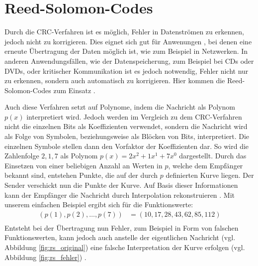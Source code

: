 \section{Reed-Solomon-Codes} \label{sec:reed_solomon_codes}
Durch die \ac{CRC}-Verfahren ist es möglich, Fehler in Datenströmen zu erkennen, jedoch nicht zu korrigieren. Dies eignet sich gut für Anwenungen , bei denen eine erneute Übertragung der Daten möglich ist, wie zum Beispiel in Netzwerken. In anderen Anwendungsfällen, wie der Datenspeicherung, zum Beispiel bei CDs oder DVDs, oder kritischer Kommunikation ist es jedoch notwendig, Fehler nicht nur zu erkennen, sondern auch automatisch zu korrigieren. Hier kommen die Reed-Solomon-Codes zum Einsatz \cite{Springer_RS}.

Auch diese Verfahren setzt auf Polynome, indem die Nachricht als Polynom  \(p(x)\) interpretiert wird. Jedoch werden im Vergleich zu dem \ac{CRC}-Verfahren nicht die einzelnen Bits als Koeffizienten verwendet, sondern die Nachricht wird als Folge von Symbolen, beziehungsweise als Blöcken von Bits, interpretiert. Die einzelnen Symbole stellen dann den Vorfaktor der Koeffizienten dar. So wird die Zahlenfolge \(2,1,7\) als Polynom \(p(x) = 2x^2 + 1x^1 + 7x^0\) dargestellt. Durch das Einsetzen von einer beliebigen Anzahl an Werten in \(p\), welche dem Empfänger bekannt sind, entstehen Punkte, die auf der durch \(p\) definierten Kurve liegen. Der Sender verschickt nun die Punkte der Kurve. Auf Basis dieser Informationen kann der Empfänger die Nachricht durch Interpolation rekonstruieren \cite{Springer_RS}. Mit unserem einfachen Beispiel ergibt sich für die Funktionswerte:
\begin{equation}
    \begin{aligned}
    (p(1), p(2), \dots, p(7)) &= (10, 17, 28, 43, 62, 85, 112) \\
    \end{aligned}
\end{equation}
Entsteht bei der Übertragung nun Fehler, zum Beispiel in Form von falschen Funktionswerten, kann jedoch auch anstelle der eigentlichen Nachricht (vgl. Abbildung \ref{fig:rs_original}) eine falsche Interpretation der Kurve erfolgen (vgl. Abbildung \ref{fig:rs_fehler}) \cite{Springer_RS}.

